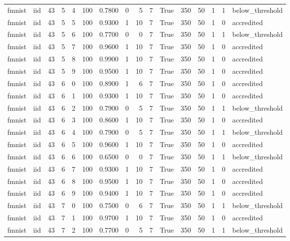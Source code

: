 \begin{tabular}{llrrrrrrrrrrrrrl}
fmnist & iid & 43 & 5 & 4 & 100 & 0.7800 & 0 & 5 & 7 & True & 350 & 50 & 1 & 1 & below\_threshold \\
fmnist & iid & 43 & 5 & 5 & 100 & 0.9300 & 1 & 10 & 7 & True & 350 & 50 & 1 & 0 & accredited \\
fmnist & iid & 43 & 5 & 6 & 100 & 0.7700 & 0 & 0 & 7 & True & 350 & 50 & 1 & 1 & below\_threshold \\
fmnist & iid & 43 & 5 & 7 & 100 & 0.9600 & 1 & 10 & 7 & True & 350 & 50 & 1 & 0 & accredited \\
fmnist & iid & 43 & 5 & 8 & 100 & 0.9900 & 1 & 10 & 7 & True & 350 & 50 & 1 & 0 & accredited \\
fmnist & iid & 43 & 5 & 9 & 100 & 0.9500 & 1 & 10 & 7 & True & 350 & 50 & 1 & 0 & accredited \\
fmnist & iid & 43 & 6 & 0 & 100 & 0.8900 & 1 & 6 & 7 & True & 350 & 50 & 1 & 0 & accredited \\
fmnist & iid & 43 & 6 & 1 & 100 & 0.9300 & 1 & 10 & 7 & True & 350 & 50 & 1 & 0 & accredited \\
fmnist & iid & 43 & 6 & 2 & 100 & 0.7900 & 0 & 5 & 7 & True & 350 & 50 & 1 & 1 & below\_threshold \\
fmnist & iid & 43 & 6 & 3 & 100 & 0.8600 & 1 & 10 & 7 & True & 350 & 50 & 1 & 0 & accredited \\
fmnist & iid & 43 & 6 & 4 & 100 & 0.7900 & 0 & 5 & 7 & True & 350 & 50 & 1 & 1 & below\_threshold \\
fmnist & iid & 43 & 6 & 5 & 100 & 0.9600 & 1 & 10 & 7 & True & 350 & 50 & 1 & 0 & accredited \\
fmnist & iid & 43 & 6 & 6 & 100 & 0.6500 & 0 & 0 & 7 & True & 350 & 50 & 1 & 1 & below\_threshold \\
fmnist & iid & 43 & 6 & 7 & 100 & 0.9300 & 1 & 10 & 7 & True & 350 & 50 & 1 & 0 & accredited \\
fmnist & iid & 43 & 6 & 8 & 100 & 0.9500 & 1 & 10 & 7 & True & 350 & 50 & 1 & 0 & accredited \\
fmnist & iid & 43 & 6 & 9 & 100 & 0.9400 & 1 & 10 & 7 & True & 350 & 50 & 1 & 0 & accredited \\
fmnist & iid & 43 & 7 & 0 & 100 & 0.7500 & 0 & 6 & 7 & True & 350 & 50 & 1 & 1 & below\_threshold \\
fmnist & iid & 43 & 7 & 1 & 100 & 0.9700 & 1 & 10 & 7 & True & 350 & 50 & 1 & 0 & accredited \\
fmnist & iid & 43 & 7 & 2 & 100 & 0.7700 & 0 & 5 & 7 & True & 350 & 50 & 1 & 1 & below\_threshold \\

\end{tabular}
